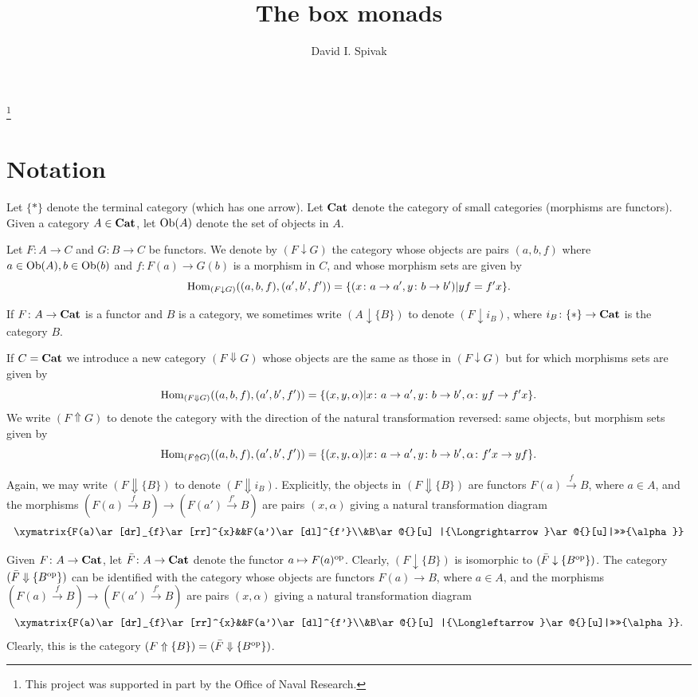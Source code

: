 \documentclass{amsart}
\makeatletter
\def\tn{\textnormal}
\def\Hom{\tn{Hom}}
\def\Ob{\tn{Ob}}
\def\to{\rightarrow}
\def\taking{\colon}
\def\too{\longrightarrow}
\def\down{\downarrow}
\def\Down{\Downarrow}
\def\Up{\Uparrow}
\def\op{^\tn{op}}
\newcommand{\To}[1]{\xrightarrow{#1}}
\def\Cat{{\bf Cat}}
\theoremstyle{remark}
\theoremstyle{definition}
\newcommand{\TriRight}[7]{\xymatrix{#1\ar[dr]_{#2}\ar[rr]^{#3}&&#4\ar[dl]^{#5}\\&#6\ar@{}[u] |{\Longrightarrow}\ar@{}[u]|>>>>{#7}}}
\newcommand{\TriLeft}[7]{\xymatrix{#1\ar[dr]_{#2}\ar[rr]^{#3}&&#4\ar[dl]^{#5}\\&#6\ar@{}[u] |{\Longleftarrow}\ar@{}[u]|>>>>{#7}}}
\makeatother
\begin{document}
\author{David I. Spivak}

\thanks{This project was supported in part by the Office of Naval Research.}

\title{The box monads}

\maketitle

\section{Notation}

Let $\{*\}$ denote the terminal category (which has one arrow).  Let $\Cat$ denote the category of small categories (morphisms are functors).  Given a category $A\in\Cat$, let $\Ob(A)$ denote the set of objects in $A$.

Let $F\taking A\to C$ and $G\taking B\to C$ be functors.  We denote by $(F\down G)$ the category whose objects are pairs $(a,b,f)$ where $a\in\Ob(A), b\in\Ob(b)$ and $f\taking F(a)\to G(b)$ is a morphism in $C$, and whose morphism sets are given by $$\Hom_{(F\down G)}((a,b,f),(a',b',f'))=\{(x\taking a\to a', y\taking b\to b')| yf=f'x\}.$$

If $F\taking A\to\Cat$ is a functor and $B$ is a category, we sometimes write $(A\down\{B\})$ to denote $(F\down i_B)$, where $i_B\taking\{*\}\to\Cat$ is the category $B$.

If $C=\Cat$ we introduce a new category $(F\Down G)$ whose objects are the same as those in $(F\down G)$ but for which morphisms sets are given by $$\Hom_{(F\Down G)}((a,b,f),(a',b',f'))=\{(x,y,\alpha)|x\taking a\to a',y\taking b\to b',\alpha\taking yf\to f'x\}.$$  We write $(F\Up G)$ to denote the category with the direction of the natural transformation reversed: same objects, but morphism sets given by $$\Hom_{(F\Up G)}((a,b,f),(a',b',f'))=\{(x,y,\alpha)|x\taking a\to a',y\taking b\to b',\alpha\taking f'x\to yf\}.$$

Again, we may write $(F\Down\{B\})$ to denote $(F\Down i_B)$.  Explicitly, the objects in $(F\Down\{B\})$ are functors $F(a)\To{f} B$, where $a\in A$, and the morphisms $(F(a)\To{f} B)\too (F(a')\To{f'} B)$ are pairs $(x,\alpha)$ giving a natural transformation diagram $$\TriRight{F(a)}{f}{x}{F(a')}{f'}{B}{\alpha}$$

Given $F\taking A\to\Cat$, let $\bar{F}\taking A\to\Cat$ denote the functor $a\mapsto F(a)\op$.  Clearly, $(F\down\{B\})$ is isomorphic to $(\bar{F}\down\{B\op\})$.  The category $(\bar{F}\Down\{B\op\})$ can be identified with the category whose objects are functors $F(a)\to B$, where $a\in A$, and the morphisms $(F(a)\To{f}B)\too(F(a')\To{f'}B)$ are pairs $(x,\alpha)$ giving a natural transformation diagram $$\TriLeft{F(a)}{f}{x}{F(a')}{f'}{B}{\alpha}.$$  Clearly, this is the category $(F\Up\{B\})=(\bar{F}\Down\{B\op\})$.
\end{document}
